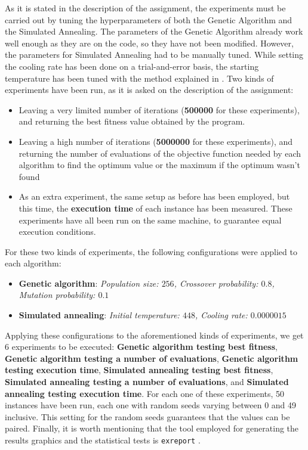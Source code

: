 \documentclass{article}[12pt]
\begin{document}
	As it is stated in the description of the assignment, the experiments must be carried out by tuning the hyperparameters of both the Genetic Algorithm and the Simulated Annealing. The parameters of the Genetic Algorithm already work well enough as they are on the code, so they have not been modified. However, the parameters for Simulated Annealing had to be manually tuned. While setting the cooling rate has been done on a trial-and-error basis, the starting temperature has been tuned with the method explained in \cite{saparam}.
\bigbreak
	Two kinds of experiments have been run, as it is asked on the description of the assignment:
	\begin{itemize}
		\item Leaving a very limited number of iterations (\textbf{500000} for these experiments), and returning the best fitness value obtained by the program.
		\item Leaving a high number of iterations (\textbf{5000000} for these experiments), and returning the number of evaluations of the objective function needed by each algorithm to find the optimum value or the maximum if the optimum wasn't found
		\item As an extra experiment, the same setup as before has been employed, but this time, the \textbf{execution time} of each instance has been measured. These experiments have all been run on the same machine, to guarantee equal execution conditions.
	\end{itemize}
\bigbreak	
	For these two kinds of experiments, the following configurations were applied to each algorithm:
	
	\begin{itemize}
		\item \textbf{Genetic algorithm}: \textit{Population size: $256$, Crossover probability: $0.8$, Mutation probability: $0.1$}
		\item \textbf{Simulated annealing}: \textit{Initial temperature: $448$, Cooling rate: $0.0000015$}
	\end{itemize}
\bigbreak
	Applying these configurations to the aforementioned kinds of experiments, we get 6 experiments to be executed: \textbf{Genetic algorithm testing best fitness}, \textbf{Genetic algorithm testing a number of evaluations}, \textbf{Genetic algorithm testing execution time}, \textbf{Simulated annealing testing best fitness}, \textbf{Simulated annealing testing a number of evaluations}, and \textbf{Simulated annealing testing execution time}. For each one of these experiments, 50 instances have been run, each one with random seeds varying between 0 and 49 inclusive. This setting for the random seeds guarantees that the values can be paired.
	\bigbreak
	Finally, it is worth mentioning that the tool employed for generating the results graphics and the statistical tests is \texttt{exreport} \cite{exreport}.
	
\end{document}
